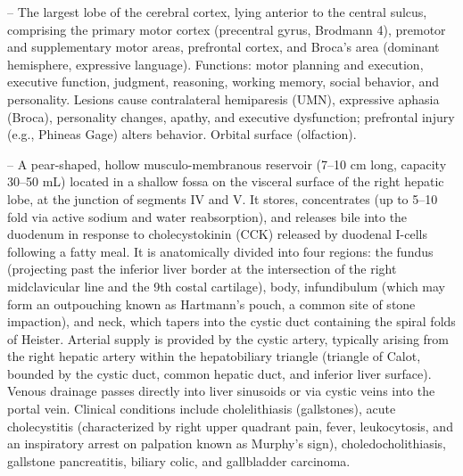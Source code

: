 -- The largest lobe of the cerebral cortex, lying anterior to the central sulcus, comprising the primary motor cortex (precentral gyrus, Brodmann 4), premotor and supplementary motor areas, prefrontal cortex, and Broca's area (dominant hemisphere, expressive language). Functions: motor planning and execution, executive function, judgment, reasoning, working memory, social behavior, and personality. Lesions cause contralateral hemiparesis (UMN), expressive aphasia (Broca), personality changes, apathy, and executive dysfunction; prefrontal injury (e.g., Phineas Gage) alters behavior. Orbital surface (olfaction).

-- A pear-shaped, hollow musculo-membranous reservoir (7--10 cm long, capacity 30--50 mL) located in a shallow fossa on the visceral surface of the right hepatic lobe, at the junction of segments IV and V. It stores, concentrates (up to 5--10 fold via active sodium and water reabsorption), and releases bile into the duodenum in response to cholecystokinin (CCK) released by duodenal I-cells following a fatty meal. It is anatomically divided into four regions: the fundus (projecting past the inferior liver border at the intersection of the right midclavicular line and the 9th costal cartilage), body, infundibulum (which may form an outpouching known as Hartmann's pouch, a common site of stone impaction), and neck, which tapers into the cystic duct containing the spiral folds of Heister. Arterial supply is provided by the cystic artery, typically arising from the right hepatic artery within the hepatobiliary triangle (triangle of Calot, bounded by the cystic duct, common hepatic duct, and inferior liver surface). Venous drainage passes directly into liver sinusoids or via cystic veins into the portal vein. Clinical conditions include cholelithiasis (gallstones), acute cholecystitis (characterized by right upper quadrant pain, fever, leukocytosis, and an inspiratory arrest on palpation known as Murphy's sign), choledocholithiasis, gallstone pancreatitis, biliary colic, and gallbladder carcinoma.


